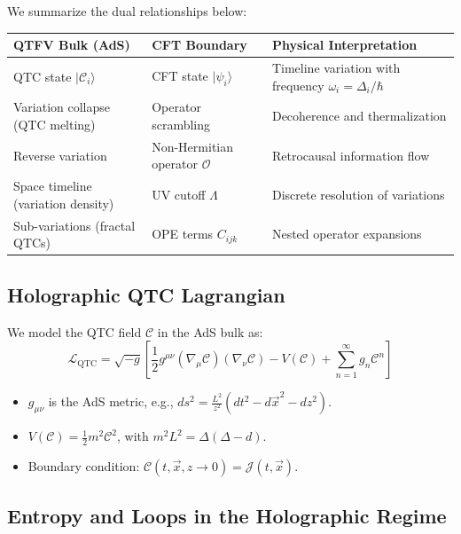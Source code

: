 \documentclass{article}
\theoremstyle{plain}
\theoremstyle{claimstyle}
\begin{document}
We summarize the dual relationships below:

\begin{center}
\begin{tabular}{|l|l|l|}
\hline
\textbf{QTFV Bulk (AdS)} & \textbf{CFT Boundary} & \textbf{Physical Interpretation} \\
\hline
QTC state \( |\mathcal{C}_i\rangle \) & CFT state \( |\psi_i\rangle \) & Timeline variation with frequency \( \omega_i = \Delta_i / \hbar \) \\
Variation collapse (QTC melting) & Operator scrambling & Decoherence and thermalization \\
Reverse variation & Non-Hermitian operator \( \mathcal{O} \) & Retrocausal information flow \\
Space timeline (variation density) & UV cutoff \( \Lambda \) & Discrete resolution of variations \\
Sub-variations (fractal QTCs) & OPE terms \( C_{ijk} \) & Nested operator expansions \\
\hline
\end{tabular}
\end{center}

\subsection{Holographic QTC Lagrangian}

We model the QTC field \( \mathcal{C} \) in the AdS bulk as:
\begin{equation}
\mathcal{L}_{\text{QTC}} = \sqrt{-g} \left[ \frac{1}{2} g^{\mu\nu} (\nabla_\mu \mathcal{C})(\nabla_\nu \mathcal{C}) - V(\mathcal{C}) + \sum_{n=1}^\infty g_n \mathcal{C}^n \right]
\end{equation}
\begin{itemize}
    \item \( g_{\mu\nu} \) is the AdS metric, e.g., \( ds^2 = \frac{L^2}{z^2}(dt^2 - d\vec{x}^2 - dz^2) \).
    \item \( V(\mathcal{C}) = \frac{1}{2} m^2 \mathcal{C}^2 \), with \( m^2 L^2 = \Delta(\Delta - d) \).
    \item Boundary condition: \( \mathcal{C}(t, \vec{x}, z \to 0) = \mathcal{J}(t, \vec{x}) \).
\end{itemize}

\subsection{Entropy and Loops in the Holographic Regime}
\end{document}
